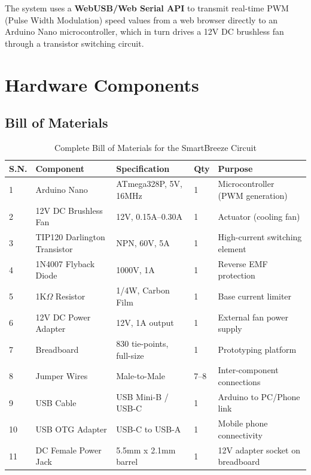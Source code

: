 \documentclass[12pt,a4paper]{article}
\begin{document}
The system uses a \textbf{WebUSB/Web Serial API} to transmit real-time PWM (Pulse Width Modulation) speed values from a web browser directly to an Arduino Nano microcontroller, which in turn drives a 12V DC brushless fan through a transistor switching circuit.

\section{Hardware Components}

\subsection{Bill of Materials}

\begin{table}[H]
\centering
\renewcommand{\arraystretch}{1.4}
\begin{tabular}{|>{\raggedright}p{0.6cm}|>{\raggedright}p{4.2cm}|>{\raggedright}p{3.5cm}|>{\raggedright}p{2cm}|>{\raggedright\arraybackslash}p{3.5cm}|}
\hline
\textbf{S.N.} & \textbf{Component} & \textbf{Specification} & \textbf{Qty} & \textbf{Purpose} \\
\hline
1 & Arduino Nano & ATmega328P, 5V, 16MHz & 1 & Microcontroller (PWM generation) \\
\hline
2 & 12V DC Brushless Fan & 12V, 0.15A--0.30A & 1 & Actuator (cooling fan) \\
\hline
3 & TIP120 Darlington Transistor & NPN, 60V, 5A & 1 & High-current switching element \\
\hline
4 & 1N4007 Flyback Diode & 1000V, 1A & 1 & Reverse EMF protection \\
\hline
5 & 1K$\Omega$ Resistor & 1/4W, Carbon Film & 1 & Base current limiter \\
\hline
6 & 12V DC Power Adapter & 12V, 1A output & 1 & External fan power supply \\
\hline
7 & Breadboard & 830 tie-points, full-size & 1 & Prototyping platform \\
\hline
8 & Jumper Wires & Male-to-Male & 7--8 & Inter-component connections \\
\hline
9 & USB Cable & USB Mini-B / USB-C & 1 & Arduino to PC/Phone link \\
\hline
10 & USB OTG Adapter & USB-C to USB-A & 1 & Mobile phone connectivity \\
\hline
11 & DC Female Power Jack & 5.5mm x 2.1mm barrel & 1 & 12V adapter socket on breadboard \\
\hline
\end{tabular}
\caption{Complete Bill of Materials for the SmartBreeze Circuit}
\label{tab:bom}
\end{table}
\end{document}
